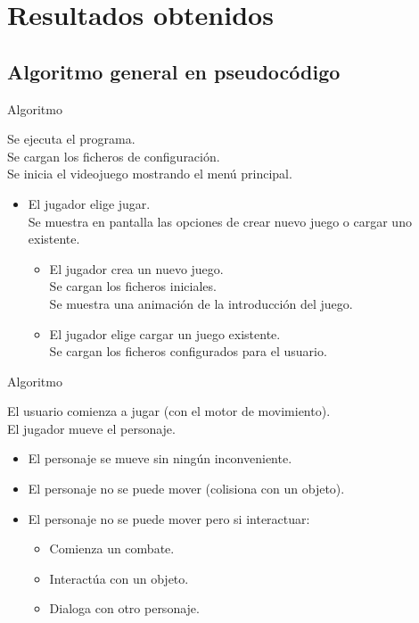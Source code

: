 \documentclass[9pt,xcolor=svgnames]{beamer}
\begin{document}
  
  
 \section{Resultados obtenidos}
 
  \subsection{Algoritmo general en pseudocódigo}

  \begin{frame}{Algoritmo}
   
   \noindent Se ejecuta el programa. \\
   Se cargan los ficheros de configuración. \\
   Se inicia el videojuego mostrando el menú principal.
   
   \begin{itemize}
    \item El jugador elige jugar.\\
	  Se muestra en pantalla las opciones de crear nuevo juego o
	  cargar uno existente.
	   
	  \begin{itemize}
	   \item El jugador crea un nuevo juego. \\
		 Se cargan los ficheros iniciales. \\
		 Se muestra
		 una animación de la introducción del juego.
		 
	   \item El jugador elige  cargar un juego existente. \\
		 Se cargan los ficheros configurados
		 para el usuario.
	  \end{itemize}
   \end{itemize}
   
  \end{frame}

  \begin{frame}{Algoritmo}
    
   El usuario comienza a jugar (con el motor de movimiento).\\ 
   El jugador mueve el personaje.
   
   \begin{itemize}
    \item El personaje se mueve sin ningún inconveniente.
    \item El personaje no se puede mover (colisiona con un objeto).
    \item El personaje no se puede mover pero si interactuar:
	  
	  \begin{itemize}
	   \item Comienza un combate.		  
	   \item Interactúa con un objeto.
	   \item Dialoga con otro personaje.  
		 
	  \end{itemize}
	  
   \end{itemize}
  \end{frame}
  
\end{document}
